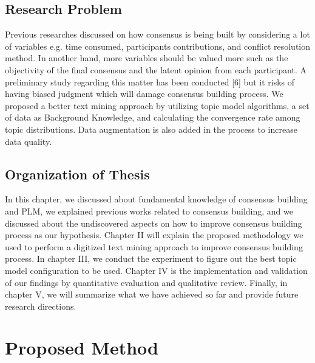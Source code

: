 \documentclass[senior]{IPSstyle}
\begin{document}
\section{Research Problem}

Previous researches discussed on how consensus is being built by considering a lot of variables e.g. time consumed, participants contributions, and conflict resolution method. In another hand, more variables should be valued more such as the objectivity of the final consensus and the latent opinion from each participant. A preliminary study regarding this matter has been conducted [6] but it risks of having biased judgment which will damage consensus building process. We proposed a better text mining approach by utilizing topic model algorithms, a set of data as Background Knowledge, and calculating the convergence rate among topic distributions. Data augmentation is also added in the process to increase data quality.

\section{Organization of Thesis}

In this chapter, we discussed about fundamental knowledge of consensus building and PLM, we explained previous works related to consensus building, and we discussed about the undiscovered aspects on how to improve consensus building process as our hypothesis. Chapter II will explain the proposed methodology we used to perform a digitized text mining approach to improve consensus building process. In chapter III, we conduct the experiment to figure out the best topic model configuration to be used. Chapter IV is the implementation and validation of our findings by quantitative evaluation and qualitative review. Finally, in chapter V, we will summarize what we have achieved so far and provide future research directions.

\chapter{Proposed Method} 
\end{document}

